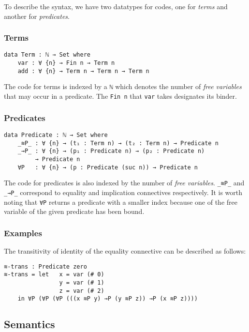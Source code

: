 \documentclass[\main/thesis.tex]{subfiles}
\begin{document}
To describe the syntax, we have two datatypes for codes,
one for \textit{terms} and another for \textit{predicates}.

\subsubsection{Terms}

\begin{lstlisting}
data Term : ℕ → Set where
    var : ∀ {n} → Fin n → Term n
    add : ∀ {n} → Term n → Term n → Term n
\end{lstlisting}

The code for terms is indexed by a \lstinline|ℕ| which denotes the number
of \textit{free variables} that may occur in a predicate.
The \lstinline|Fin n| that \lstinline|var| takes designates its binder.
\subsubsection{Predicates}

\begin{lstlisting}
data Predicate : ℕ → Set where
    _≋P_ : ∀ {n} → (t₁ : Term n) → (t₂ : Term n) → Predicate n
    _→P_ : ∀ {n} → (p₁ : Predicate n) → (p₂ : Predicate n)
         → Predicate n
    ∀P   : ∀ {n} → (p : Predicate (suc n)) → Predicate n
\end{lstlisting}

The code for predicates is also indexed by the number of \textit{free variables}.
\lstinline|_≋P_| and \lstinline|_→P_| correspond to equality and implication
connectives respectively.
It is worth noting that \lstinline|∀P| returns a predicate with a smaller index
because one of the free variable of the given predicate has been bound.

\subsubsection{Examples}

The transitivity of identity of the equality connective can be described
as follows:

\begin{lstlisting}
≋-trans : Predicate zero
≋-trans = let   x = var (# 0)
                y = var (# 1)
                z = var (# 2)
    in ∀P (∀P (∀P (((x ≋P y) →P (y ≋P z)) →P (x ≋P z))))
\end{lstlisting}

\subsection{Semantics}
\end{document}

